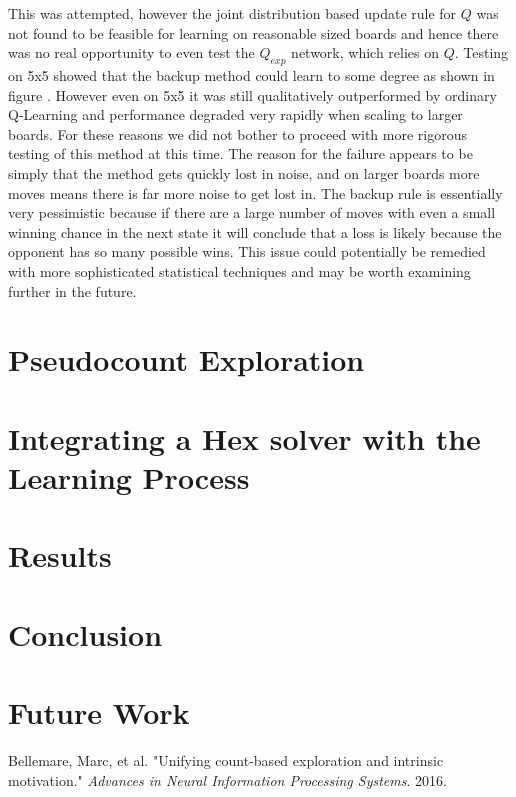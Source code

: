 \documentclass{article}
\begin{document}
This was attempted, however the joint distribution based update rule for $Q$ was not found to be feasible for learning on reasonable sized boards and hence there was no real opportunity to even test the $Q_{exp}$ network, which relies on $Q$.  Testing on 5x5 showed that the backup method could learn to some degree as shown in figure \cite{5x5_scores}. However even on 5x5 it was still qualitatively outperformed by ordinary Q-Learning and performance degraded very rapidly when scaling to larger boards. For these reasons we did not bother to proceed with more rigorous testing of this method at this time. The reason for the failure appears to be simply that the method gets quickly lost in noise, and on larger boards more moves means there is far more noise to get lost in. The backup rule is essentially very pessimistic because if there are a large number of moves with even a small winning chance in the next state it will conclude that a loss is likely because the opponent has so many possible wins. This issue could potentially be remedied with more sophisticated statistical techniques and may be worth examining further in the future.


\section*{Pseudocount Exploration}


\section*{Integrating a Hex solver with the Learning Process}

\section*{Results}

\section*{Conclusion}

\section*{Future Work}

\begin{thebibliography}{9}
Bellemare, Marc, et al. "Unifying count-based exploration and intrinsic motivation." \textit{Advances in Neural Information Processing Systems}. 2016.
\end{thebibliography}
\end{document}
